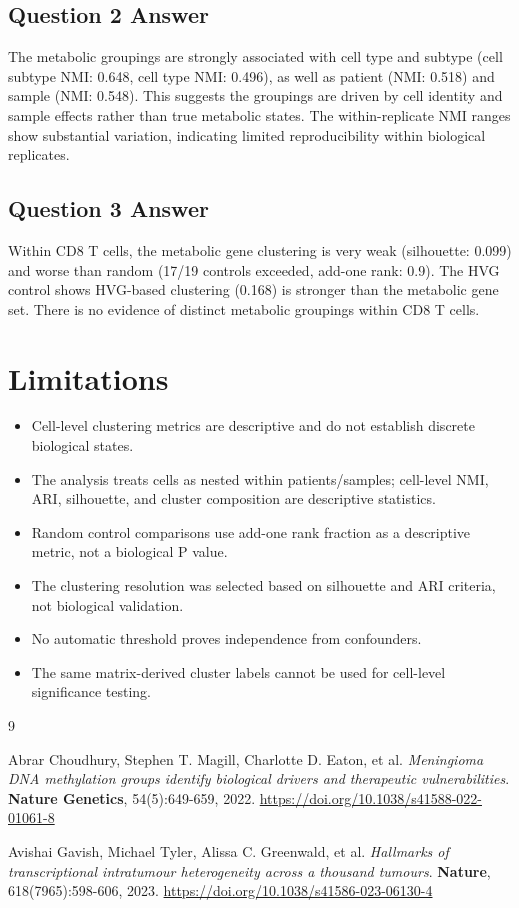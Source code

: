 \documentclass[11pt]{article}
\begin{document}
\subsection{Question 2 Answer}

The metabolic groupings are strongly associated with cell type and subtype (cell subtype NMI: 0.648, cell type NMI: 0.496), as well as patient (NMI: 0.518) and sample (NMI: 0.548). This suggests the groupings are driven by cell identity and sample effects rather than true metabolic states. The within-replicate NMI ranges show substantial variation, indicating limited reproducibility within biological replicates.

\subsection{Question 3 Answer}

Within CD8 T cells, the metabolic gene clustering is very weak (silhouette: 0.099) and worse than random (17/19 controls exceeded, add-one rank: 0.9). The HVG control shows HVG-based clustering (0.168) is stronger than the metabolic gene set. There is no evidence of distinct metabolic groupings within CD8 T cells.

\section{Limitations}

\begin{itemize}
    \item Cell-level clustering metrics are descriptive and do not establish discrete biological states.
    \item The analysis treats cells as nested within patients/samples; cell-level NMI, ARI, silhouette, and cluster composition are descriptive statistics.
    \item Random control comparisons use add-one rank fraction as a descriptive metric, not a biological P value.
    \item The clustering resolution was selected based on silhouette and ARI criteria, not biological validation.
    \item No automatic threshold proves independence from confounders.
    \item The same matrix-derived cluster labels cannot be used for cell-level significance testing.
\end{itemize}

\begin{thebibliography}{9}

Abrar Choudhury, Stephen T. Magill, Charlotte D. Eaton, et al.
\textit{Meningioma DNA methylation groups identify biological drivers and therapeutic vulnerabilities}.
\textbf{Nature Genetics}, 54(5):649-659, 2022.
\url{https://doi.org/10.1038/s41588-022-01061-8}

Avishai Gavish, Michael Tyler, Alissa C. Greenwald, et al.
\textit{Hallmarks of transcriptional intratumour heterogeneity across a thousand tumours}.
\textbf{Nature}, 618(7965):598-606, 2023.
\url{https://doi.org/10.1038/s41586-023-06130-4}

\end{thebibliography}
\end{document}
